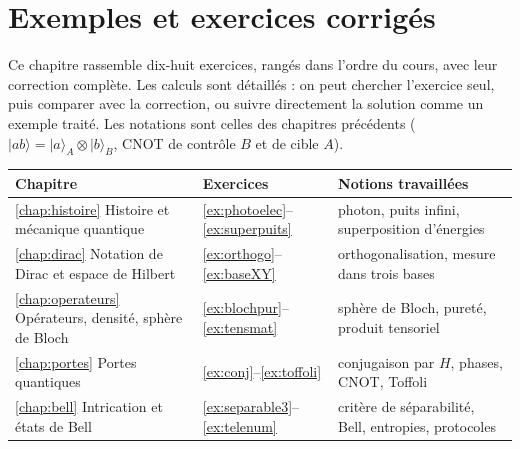 
\providecommand{\ket}[1]{|#1\rangle}
\providecommand{\bra}[1]{\langle #1|}
\providecommand{\braket}[2]{\langle #1|#2\rangle}

\section{Exemples et exercices corrigés}\label{chap:exercices}

Ce chapitre rassemble dix-huit exercices, rangés dans l'ordre du cours, avec leur correction
complète. Les calculs sont détaillés : on peut chercher l'exercice seul, puis comparer avec la
correction, ou suivre directement la solution comme un exemple traité. Les notations sont celles des
chapitres précédents ($\ket{ab}=\ket{a}_A\otimes\ket{b}_B$, CNOT de contrôle $B$ et de cible $A$).

\begin{center}
\renewcommand{\arraystretch}{1.35}
\begin{tabular}{@{}l l l@{}}
\toprule
\textbf{Chapitre} & \textbf{Exercices} & \textbf{Notions travaillées} \\
\midrule
\ref{chap:histoire} Histoire et mécanique quantique & \ref{ex:photoelec}--\ref{ex:superpuits}
  & photon, puits infini, superposition d'énergies \\
\ref{chap:dirac} Notation de Dirac et espace de Hilbert & \ref{ex:orthogo}--\ref{ex:baseXY}
  & orthogonalisation, mesure dans trois bases \\
\ref{chap:operateurs} Opérateurs, densité, sphère de Bloch & \ref{ex:blochpur}--\ref{ex:tensmat}
  & sphère de Bloch, pureté, produit tensoriel \\
\ref{chap:portes} Portes quantiques & \ref{ex:conj}--\ref{ex:toffoli}
  & conjugaison par $H$, phases, CNOT, Toffoli \\
\ref{chap:bell} Intrication et états de Bell & \ref{ex:separable3}--\ref{ex:telenum}
  & critère de séparabilité, Bell, entropies, protocoles \\
\bottomrule
\end{tabular}
\end{center}

